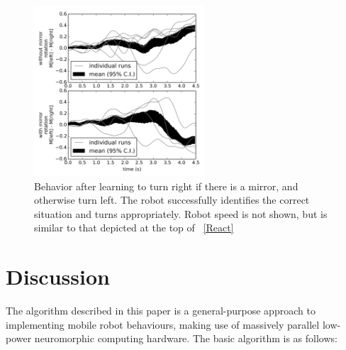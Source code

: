 \documentclass[conference]{IEEEtran}
\begin{document}
\begin{figure}[!t]
\centering
\includegraphics[width=2.5in]{learn-mirror/learnmirror.png}
\caption{Behavior after learning to turn right if there is a mirror, and otherwise turn left. The robot successfully identifies the correct situation and turns appropriately. Robot speed is not shown, but is similar to that depicted at the top of \figurename~\ref{React}}
\label{Right}
\end{figure}

\section{Discussion}
The algorithm described in this paper is a general-purpose approach to
implementing mobile robot behaviours, 
making use of massively parallel low-power neuromorphic computing hardware. 
The basic algorithm is as follows:
\end{document}
